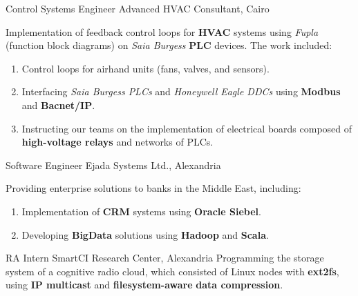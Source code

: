 \documentclass[letterpaper]{twentysecondcv} %
\begin{document}
\begin{twenty}
               {Control Systems Engineer}
               {Advanced HVAC Consultant, Cairo}
               {Implementation of feedback control loops for \textbf{HVAC} systems using \textit{Fupla} (function block diagrams) on
                \textit{Saia Burgess} \textbf{PLC} devices. The work included:
                \begin{enumerate}
                    \item{Control loops for airhand units (fans, valves, and sensors).}
                    \item{Interfacing \textit{Saia Burgess PLCs} and \textit{Honeywell Eagle DDCs} using
                          \textbf{Modbus} and \textbf{Bacnet/IP}.}
                    \item{Instructing our teams on the implementation of electrical boards composed of
                          \textbf{high-voltage relays} and networks of PLCs.}
                \end{enumerate}
               }

               {Software Engineer}
               {Ejada Systems Ltd., Alexandria}
               {Providing enterprise solutions to banks in the Middle East, including:
                \begin{enumerate}
                    \item Implementation of \textbf{CRM} systems using \textbf{Oracle Siebel}.
                    \item Developing \textbf{BigData} solutions using
                          \textbf{Hadoop} and \textbf{Scala}.
                \end{enumerate}}

               {RA Intern}
               {SmartCI Research Center, Alexandria}
               {Programming the storage system of a cognitive radio cloud, which consisted of
                Linux nodes with \textbf{ext2fs}, using \textbf{IP multicast} and \textbf{filesystem-aware}
                \textbf{data compression}.}

\end{twenty}
\end{document}
